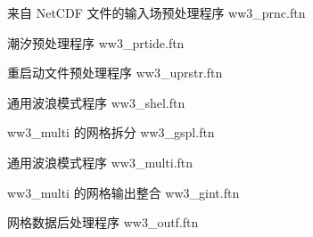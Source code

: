 \noindent
来自 NetCDF 文件的输入场预处理程序 \hfill {\file ww3\_prnc.ftn}

\begin{flisti}
\end{flisti}

\noindent
潮汐预处理程序 \hfill {\file ww3\_prtide.ftn}

\begin{flisti}
\end{flisti}

\noindent
重启动文件预处理程序 \hfill {\file ww3\_uprstr.ftn}

\begin{flisti}
\end{flisti}

\noindent
通用波浪模式程序 \hfill {\file ww3\_shel.ftn}

\begin{flisti}
\end{flisti}


% 

\noindent
{\file ww3\_multi} 的网格拆分 \hfill {\file ww3\_gspl.ftn}

\begin{flisti}
\end{flisti}

\noindent
通用波浪模式程序 \hfill {\file ww3\_multi.ftn}

\begin{flisti}
\end{flisti}

\noindent
{\file ww3\_multi} 的网格输出整合 \hfill {\file ww3\_gint.ftn}

\begin{flisti}
\end{flisti}

\noindent
网格数据后处理程序 \hfill {\file ww3\_outf.ftn}

\begin{flisti}
\end{flisti}

